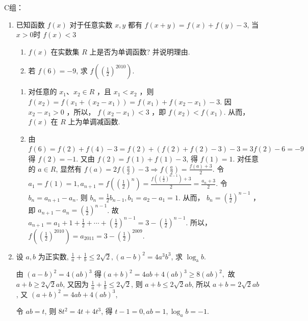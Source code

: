 C组：
\begin{enumerate}
    \item 已知函数 $f\left(x\right)$ 对于任意实数 $x, y$ 都有 $f\left(x+y\right)=f\left(x\right)+f\left(y\right)-3$, 当 $x>0$时 $f\left(x\right)<3$
    \begin{enumerate}
        \item $f\left(x\right)$ 在实数集 $R$ 上是否为单调函数? 并说明理由.
        \item 若 $f\left(6\right)=-9$, 求 $f\left(\left(\frac{1}{2}\right)^{2010}\right)$.
    \end{enumerate}
    \begin{jieda}
    \begin{enumerate}
        \item 对任意的 $x_1 、 x_2 \in R$ ，且 $x_1<x_2$ ，则 $f\left(x_2\right)=f\left(x_1+\left(x_2-x_1\right)\right)=f\left(x_1\right)+f\left(x_2-x_1\right)-3$.
因 $x_2-x_1>0$ ，所以， $f\left(x_2-x_1\right)<3$ ，即 $f\left(x_2\right)<f\left(x_1\right)$.
从而， $f\left(x\right)$ 在 $R$ 上为单调减函数.
\item 由 $f\left(6\right)=f\left(2\right)+f\left(4\right)-3=f\left(2\right)+\left(f\left(2\right)+f\left(2\right)-3\right)-3=3 f\left(2\right)-6=-9$得 $f\left(2\right)=-1$. 又由 $f\left(2\right)=f\left(1\right)+f\left(1\right)-3$, 得 $f\left(1\right)=1$.
对任意的 $a \in R$, 显然有 $f\left(a\right)=2 f\left(\frac{a}{2}\right)-3 \Rightarrow f\left(\frac{a}{2}\right)=\frac{f\left(a\right)+3}{2}$.
令 $a_1=f\left(1\right)=1, a_{n+1}=f\left(\left(\frac{1}{2}\right)^n\right)=\frac{f\left(\left(\frac{1}{2}\right)^{n-1}\right)+3}{2}=\frac{a_n+3}{2}$.
令 $b_n=a_{n+1}-a_n$. 则 $b_n=\frac{1}{2} b_{n-1}, b_1=a_2-a_1=1$.
从而， $b_n=\left(\frac{1}{2}\right)^{n-1}$ ，即 $a_{n+1}-a_n=\left(\frac{1}{2}\right)^{n-1}$.
故 $a_{n+1}=a_1+1+\frac{1}{2}+\cdots+\left(\frac{1}{2}\right)^{n-1}=3-\left(\frac{1}{2}\right)^{n-1}$.
所以， $f\left(\left(\frac{1}{2}\right)^{2010}\right)=a_{2011}=3-\left(\frac{1}{2}\right)^{2009}$.
    \end{enumerate}
    \end{jieda}

\item 设 $a, b$ 为正实数, $\frac{1}{a}+\frac{1}{b} \leq 2 \sqrt{2},\left(a-b\right)^2=4 a^3 b^3$, 求 $\log _{\mathrm{a}} b$.
\begin{jieda}
由 $\left(a-b\right)^2=4\left(a b\right)^3$ 得$\left(a+b\right)^2=4 a b+4\left(a b\right)^3 \geqslant 8\left(a b\right)^2,$
故 $a+b \geqslant 2 \sqrt{2} a b$,
又因为 $\frac{1}{a}+\frac{1}{b} \leqslant 2 \sqrt{2}$, 则 $a+b \leqslant 2 \sqrt{2} a b$,
所以 $a+b=2 \sqrt{2} a b$,
又 $\left(a+b\right)^2=4 a b+4\left(a b\right)^3$,

令 $a b=t$, 则 $8 t^2=4 t+4 t^3$, 得 $t-1=0, a b=1, \log _a b=-1$.

\end{jieda}
\end{enumerate}

